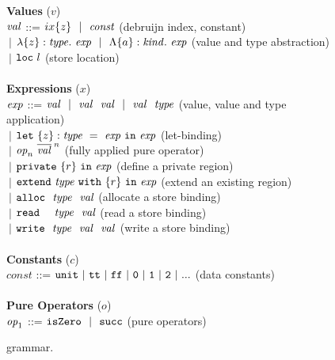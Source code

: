 \begin{figure}
{\begin{tabbing}
\textbf{Values} ($v$)\\
$\mval$ \> ::=  \> $ix\bra{z} ~~|~~ \mconst$ 
        \> (debruijn index, constant)
\\
        \> $~|$ \> $ \lambda \bra{z} : \mtype.~ \mexp
               ~~|~~ \Lambda \bra{a} : \mkind.~ \mexp$
        \> (value and type abstraction)
\\
        \> $~|$ \> $\vloc{l}$
        \> (store location)
\\
\\


\textbf{Expressions} ($x$)\\
$\mexp$ \> ::=  \> $\mval
                        ~~|~~ \mval~~ \mval
                        ~~|~~ \mval~~ \mtype$
        \> (value, value and type application)
\\
        \> $~|$ \> $\xlet{\bra{z}}{\mtype}{\mexp}{\mexp}$
        \> (let-binding)
\\
        \> $~|$ \> $\mop_n~ \ov{\mval}^{\; n}$
        \> (fully applied pure operator)
\\
        \> $~|$ \> $\xprivate{\bra{r}}{\mexp}$
        \> (define a private region)
\\
        \> $~|$ \> $\xextend{\mtype}{\bra{r}}{\mexp}$
        \> (extend an existing region)
\\
        \> $~|$ \> $\kalloc~~ \mtype~~ \mval$
        \> (allocate a store binding)
\\
        \> $~|$ \> $\kread~~~~  \mtype~~ \mval$
        \> (read a store binding)
\\
        \> $~|$ \> $\kwrite~~ \mtype~~ \mval~~ \mval$
        \> (write a store binding)
\\
\\


\textbf{Constants} ($c$)\\
$const$ \> ::=  
        \> $\tt{unit} 
                ~|~ \tt{tt}
                ~|~ \tt{ff}
                ~|~ \tt{0} 
                ~|~ \tt{1} 
                ~|~ \tt{2}
                ~|~ ...$
        \> (data constants)
\\
\\

\textbf{Pure Operators} ($o$)\\
$\mop_1$
        \> ::=  \> $\tt{isZero} 
                        ~~|~~ \tt{succ}$
        \> (pure operators)
\end{tabbing}
} %
\medskip
\caption{\SystemFre grammar.}
\label{f:Language}
\end{figure}
